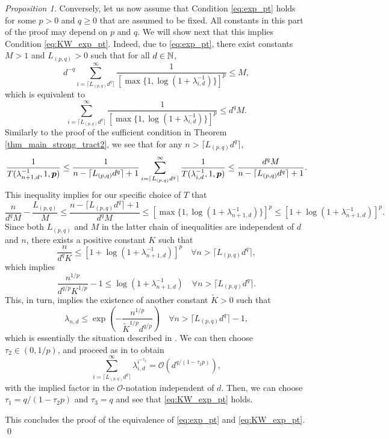\documentclass[sort&compress]{elsarticle}
\begin{document}
\begin{proof}[Proposition 1]
Conversely, let us now assume that Condition \eqref{eq:exp_pt} holds for some $p> 0$ and $q\ge 0$ that are assumed to be fixed. All constants in this part of the proof may depend on $p$ and $q$.  We will show next that this implies Condition \eqref{eq:KW_exp_pt}. Indeed, due to \eqref{eq:exp_pt}, there exist constants $M > 1$ and $L_{(p,q)}>0$ such that for all $d\in\mathbb{N}$,
\[
d^{-q}
\sum_{i=\lceil L_{(p,q)} d^{q}\rceil}^\infty \frac{1}{[\max\{1,\log(1+\lambda_{i,d}^{-1})\}]^p} \le M,
\]
which is equivalent to
\[
\sum_{i=\lceil L_{(p,q)} d^{q}\rceil}^\infty \frac{1}{[\max\{1,\log(1+\lambda_{i,d}^{-1})\}]^p} \le d^q M.
\]
Similarly to the proof of the sufficient condition in Theorem \ref{thm_main_strong_tract2}, we see that for any $n > \lceil L_{(p,q)} d^{q}\rceil $,
\[
\frac{1}{T(\lambda_{n+1,d}^{-1},1,\boldsymbol{p})} \le \frac{1}{n-\lceil L_{(p,q)} d^{q}\rceil +1 }
\sum_{i=\lceil L_{(p,q)} d^{q}\rceil}^\infty  \frac{1}{T(\lambda_{i,d}^{-1},1,\boldsymbol{p})}
\le \frac{d^q M}{n-\lceil L_{(p,q)} d^{q}\rceil +1 }.
\]
This inequality implies for our specific choice of $T$ that
\[
\frac{n}{d^q M}-\frac{L_{(p,q)}}{M}\le\frac{n-\lceil L_{(p,q)} d^{q}\rceil +1 }{d^q M} \le [\max\{1,\log(1+\lambda_{n+1,d}^{-1})\}]^p
\le [1 + \log(1+\lambda_{n+1,d}^{-1})]^p.
\]
Since both $L_{(p,q)}$ and $M$ in the latter chain of inequalities are independent of $d$ and $n$, there
exists a positive constant $K$ such that
\[
\frac{n}{d^q K} \le [1 + \log(1+\lambda_{n+1,d}^{-1})]^p\quad \forall n > \lceil L_{(p,q)} d^{q}\rceil,
\]
which implies
\[
\frac{n^{1/p}}{d^{q/p} K^{1/p}} -1 \le \log(1+\lambda_{n+1,d}^{-1})\quad \forall n > \lceil L_{(p,q)} d^{q}\rceil.
\]
This, in turn, implies the existence of another constant $\widetilde{K}>0$ such that
\[
\lambda_{n,d} \le \exp\left(-\frac{n^{1/p}}{\widetilde{K}^{1/p} d^{q/p}}\right)
\quad \forall n > \lceil L_{(p,q)} d^{q}\rceil-1,
\]
which is essentially the situation described in \cite[p.~118]{KriWoz19a}. We can then choose $\tau_2\in (0,1/p)$,
and proceed as in \cite{KriWoz19a} to obtain
\[
\sum_{i=\lceil L_{(p,q)} d^{q}\rceil}^\infty \lambda_{i,d}^{i^{-\tau_2}}=\mathcal{O}(d^{q/(1-\tau_2 p)}),
\]
with the implied factor in the $\mathcal{O}$-notation independent of $d$. Then, we can choose $\tau_1=q/(1-\tau_2 p)$ and $\tau_3=q$ and see that \eqref{eq:KW_exp_pt} holds.

This concludes the proof of the equivalence of \eqref{eq:exp_pt} and \eqref{eq:KW_exp_pt}. \qed

\end{proof}


%

%
%
\end{document}

